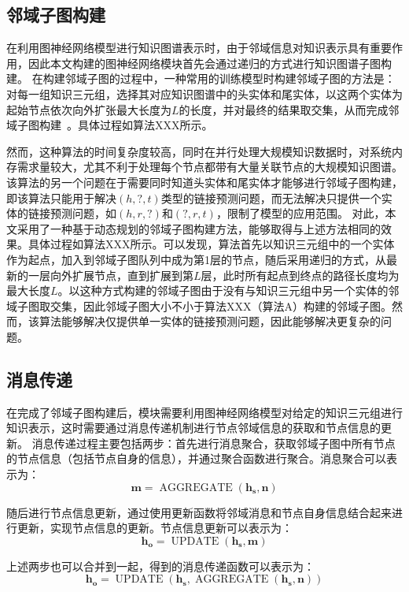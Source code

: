 \documentclass[algorithmlist, AutoFakeBold, AutoFakeSlant, figurelist, tablelist, nomlist, masters]{seuthesix}
\begin{document}
\subsection{邻域子图构建}
在利用图神经网络模型进行知识图谱表示时，由于邻域信息对知识表示具有重要作用，因此本文构建的图神经网络模块首先会通过递归的方式进行知识图谱子图构建。
在构建邻域子图的过程中，一种常用的训练模型时构建邻域子图的方法是：对每一组知识三元组，选择其对应知识图谱中的头实体和尾实体，以这两个实体为起始节点依次向外扩张最大长度为$L$的长度，并对最终的结果取交集，从而完成邻域子图构建~\cite{teru2020inductive}。具体过程如算法XXX所示。

然而，这种算法的时间复杂度较高，同时在并行处理大规模知识数据时，对系统内存需求量较大，尤其不利于处理每个节点都带有大量关联节点的大规模知识图谱。该算法的另一个问题在于需要同时知道头实体和尾实体才能够进行邻域子图构建，即该算法只能用于解决$(h, ?, t)$类型的链接预测问题，而无法解决只提供一个实体的链接预测问题，如$(h, r, ?)$和$(?, r, t)$，限制了模型的应用范围。
对此，本文采用了一种基于动态规划的邻域子图构建方法，能够取得与上述方法相同的效果。具体过程如算法XXX所示。可以发现，算法首先以知识三元组中的一个实体作为起点，加入到邻域子图队列中成为第1层的节点，随后采用递归的方式，从最新的一层向外扩展节点，直到扩展到第$L$层，此时所有起点到终点的路径长度均为最大长度$L$。以这种方式构建的邻域子图由于没有与知识三元组中另一个实体的邻域子图取交集，因此邻域子图大小不小于算法XXX（算法A）构建的邻域子图。然而，该算法能够解决仅提供单一实体的链接预测问题，因此能够解决更复杂的问题。

\subsection{消息传递}
在完成了邻域子图构建后，模块需要利用图神经网络模型对给定的知识三元组进行知识表示，这时需要通过消息传递机制进行节点邻域信息的获取和节点信息的更新。
消息传递过程主要包括两步：首先进行消息聚合，获取邻域子图中所有节点的节点信息（包括节点自身的信息），并通过聚合函数进行聚合。消息聚合可以表示为：
\begin{equation}
  \bm{m} = \operatorname{AGGREGATE}(\bm{h_s}, \bm{n})
\end{equation}

随后进行节点信息更新，通过使用更新函数将邻域消息和节点自身信息结合起来进行更新，实现节点信息的更新。节点信息更新可以表示为：
\begin{equation}
  \bm{h_o} = \operatorname{UPDATE}(\bm{h_s}, \bm{m})
\end{equation}

上述两步也可以合并到一起，得到的消息传递函数可以表示为：
\begin{equation}
  \bm{h_o} = \operatorname{UPDATE}(\bm{h_s}, \operatorname{AGGREGATE}(\bm{h_s}, \bm{n}))
  \label{equation_MessagePassing}
\end{equation}
\end{document}
